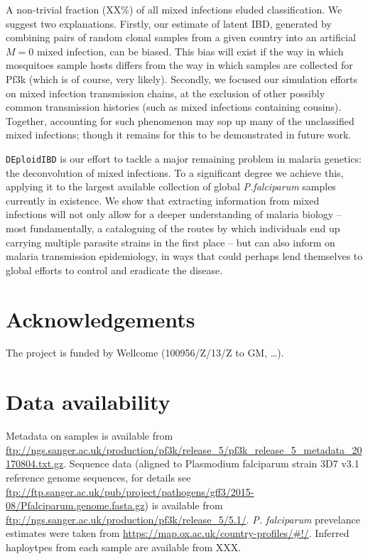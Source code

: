 \documentclass[9pt,lineno]{elife}
\begin{document}
A non-trivial fraction (XX\%) of all mixed infections eluded classification.  We suggest two explanations.  Firstly, our estimate of latent IBD, generated by combining pairs of random clonal samples from a given country into an artificial $M=0$ mixed infection, can be biased. This bias will exist if the way in which mosquitoes sample hosts differs from the way in which samples are collected for Pf3k (which is of course, very likely). Secondly, we focused our simulation efforts on mixed infection transmission chains, at the exclusion of other possibly common transmission histories (such as mixed infections containing cousins). Together, accounting for such phenomenon may sop up many of the unclassified mixed infections; though it remains for this to be demonstrated in future work.

\texttt{DEploidIBD} is our effort to tackle a major remaining problem in malaria genetics: the deconvolution of mixed infections.  To a significant degree we achieve this, applying it to the largest available collection of global \textit{P.falciparum} samples currently in existence.  We show that extracting information from mixed infections will not only allow for a deeper understanding of malaria biology -- most fundamentally, a cataloguing of the routes by which individuals end up carrying multiple parasite strains in the first place -- but can also inform on malaria transmission epidemiology, in ways that could perhaps lend themselves to global efforts to control and eradicate the disease.



\section{Acknowledgements}
The project is funded by  Wellcome (100956/Z/13/Z to GM, \ldots).


\section{Data availability}
Metadata on samples is available from \url{ftp://ngs.sanger.ac.uk/production/pf3k/release_5/pf3k_release_5_metadata_20170804.txt.gz}.  Sequence data (aligned to Plasmodium falciparum strain 3D7 v3.1 reference genome sequences, for details see \url{      ftp://ftp.sanger.ac.uk/pub/project/pathogens/gff3/2015-08/Pfalciparum.genome.fasta.gz}) is available from  \url{ftp://ngs.sanger.ac.uk/production/pf3k/release_5/5.1/}.  {\it P. falciparum} prevelance estimates were taken from \url{https://map.ox.ac.uk/country-profiles/#!/}.  Inferred haploytpes from each sample are available from XXX.
\end{document}
